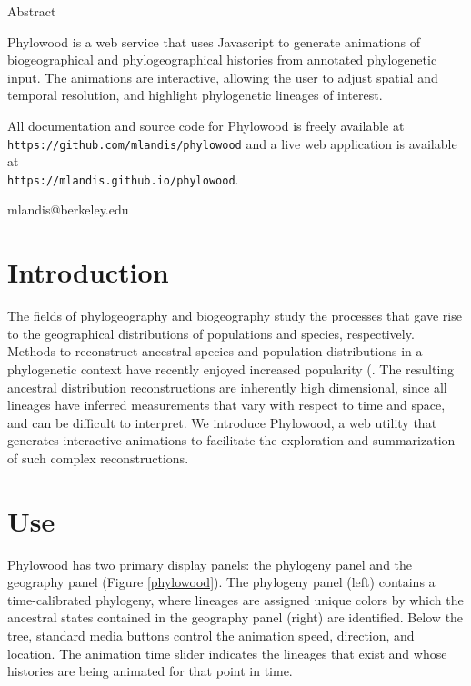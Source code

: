 \documentclass[11pt]{article}
\begin{document}
\newpage

\begin{center}
{\sc Abstract}
\end{center}

 Phylowood is a web service that uses Javascript to generate animations of biogeographical and phylogeographical histories from annotated phylogenetic input. The animations are interactive, allowing the user to adjust spatial and temporal resolution, and highlight phylogenetic lineages of interest.

 All documentation and source code for Phylowood is freely available at \\
\texttt{https://github.com/mlandis/phylowood} and a live web application is available at \\
\texttt{https://mlandis.github.io/phylowood}.

 mlandis@berkeley.edu

\bigskip


\section{Introduction}

The fields of phylogeography and biogeography study the processes that gave rise to the geographical distributions of populations and species, respectively. Methods to reconstruct ancestral species and population distributions in a phylogenetic context have recently enjoyed increased popularity (\citep{ronquist97, ree08, lemmon08, lemey09, yu10, landis12}. The resulting ancestral distribution reconstructions are inherently high dimensional, since all lineages have inferred measurements that vary with respect to time and space, and can be difficult to interpret. We introduce Phylowood, a web utility that generates interactive animations to facilitate the exploration and summarization of such complex reconstructions.

\section{Use}

Phylowood has two primary display panels: the phylogeny panel and the geography panel (Figure \ref{phylowood}). The phylogeny panel (left) contains a time-calibrated phylogeny, where lineages are assigned unique colors by which the ancestral states contained in the geography panel (right) are identified. Below the tree, standard media buttons control the animation speed, direction, and location. The animation time slider indicates the lineages that exist and whose histories are being animated for that point in time.
\end{document}
